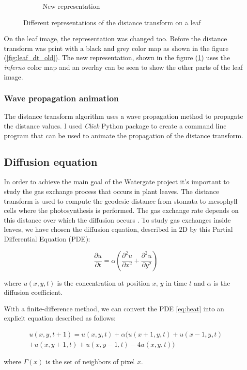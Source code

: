 \begin{figure}
\begin{subfigure}{0.54\textwidth}
        \caption{New representation}
        \label{fig:leaf_dt_new}
    \end{subfigure}
    \caption{Different representations of the distance transform on a leaf}
    \label{fig:leaf_dt}
\end{figure}

On the leaf image, the representation was changed too. Before the distance transform
was print with a black and grey color map as shown in the figure (\ref{fig:leaf_dt_old}). 
The new representation, shown in the figure (\ref{fig:leaf_dt_new}) uses the 
\textit{inferno} color map and an overlay can be seen to show the other parts of the 
leaf image.

\subsubsection{Wave propagation animation}

The distance transform algorithm uses a wave propagation method to propagate the
distance values. I used \textit{Click} \cite{CLICK} Python package to create a
command line program that can be used to animate the propagation of the distance
transform.

\subsection{Diffusion equation}

In order to achieve the main goal of the Watergate project it's important to study the
gas exchange process that occurs in plant leaves. The distance transform is used to
compute the geodesic distance from stomata to mesophyll cells where the photosynthesis
is performed. The gas exchange rate depends on this distance over which the diffusion 
occurs \cite{RSB}. To study gas exchanges inside leaves, we have chosen the diffusion
equation, described in 2D by this Partial Differential Equation (PDE):

\begin{equation}
  \frac{\partial u}{\partial t} = \alpha \left( \frac{\partial^2u}{\partial x^2} + \frac{\partial^2u}{\partial y^2} \right)
  \label{eq:heat}
\end{equation}

where $u(x,y,t)$ is the concentration at position $x$, $y$ in time $t$ and $\alpha$ is the
diffusion coefficient.

With a finite-difference method, we can convert the PDE \eqref{eq:heat} into an explicit 
equation described as follows:

\begin{multline}
    u(x,y,t+1) = u(x,y,t) + \alpha \big(
        u(x+1,y,t) + u(x-1,y,t) \\
        + u(x,y+1,t) + u(x,y-1,t) 
        - 4 u(x,y,t)
        \big)
    \label{eq:iterative}
\end{multline}

where $\Gamma(x)$ is the set of neighbors of pixel $x$.

